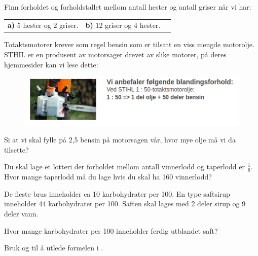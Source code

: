 \vs
{}

Finn forholdet og forholdstallet mellom antall hester og antall griser når vi har:\os
\begin{tabular}{@{}l l l}	
	\textbf{a)} 5 hester og 2 griser. &\textbf{b)} 12 griser og 4 hester.
\end{tabular}

\newpage
{}
Totaktsmotorer krever som regel bensin som er tilsatt en viss mengde motorolje. STHIL er en produsent av motorsager drevet av slike motorer, på deres hjemmesider kan vi lese dette:
\begin{figure}
	\includegraphics[]{stihl}
\end{figure}
Si at vi skal fylle på 2,5 bensin på motorsagen vår, hvor mye olje må vi da tilsette?

\vsk \vspace{12pt}

Du skal lage et lotteri der forholdet mellom antall vinnerlodd og taperlodd er $ \frac{1}{8} $. Hvor mange taperlodd må du lage hvis du skal ha 160 vinnerlodd?

De fleste brus inneholder ca 10 karbohydrater per 100. En type saftsirup inneholder 44 karbohydrater per 100. Saften skal lages med 2 deler sirup og 9 deler vann. \os

Hvor mange karbohydrater per 100 inneholder ferdig utblandet saft? \os

\newpage
{}
Bruk  og  til å utlede formelen i . 



